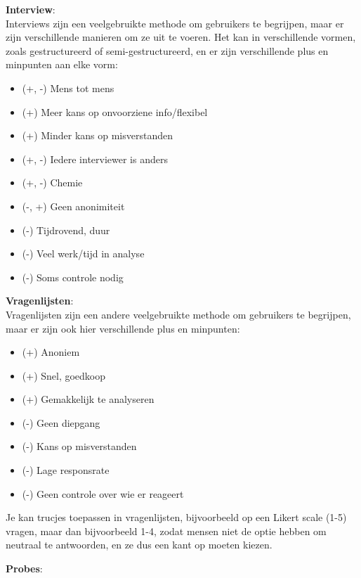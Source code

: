 \documentclass[nonacm, sigconf, balance=true]{acmart}
\begin{document}
    \noindent\textbf{Interview}:\\
    \noindent Interviews zijn een veelgebruikte methode om gebruikers te begrijpen, maar er zijn verschillende manieren om ze uit te voeren.
    Het kan in verschillende vormen, zoals gestructureerd of semi-gestructureerd, en er zijn verschillende plus en minpunten aan elke vorm:

    \begin{itemize}
        \item (+, -) Mens tot mens
        \item (+) Meer kans op onvoorziene info/flexibel
        \item (+) Minder kans op misverstanden
        \item (+, -) Iedere interviewer is anders
        \item (+, -) Chemie
        \item (-, +) Geen anonimiteit
        \item (-) Tijdrovend, duur
        \item (-) Veel werk/tijd in analyse
        \item (-) Soms controle nodig
    \end{itemize}

    \noindent\textbf{Vragenlijsten}:\\
    \noindent Vragenlijsten zijn een andere veelgebruikte methode om gebruikers te begrijpen, maar er zijn ook hier verschillende plus en minpunten:
    \begin{itemize}
        \item (+) Anoniem
        \item (+) Snel, goedkoop
        \item (+) Gemakkelijk te analyseren
        \item (-) Geen diepgang
        \item (-) Kans op misverstanden
        \item (-) Lage responsrate
        \item (-) Geen controle over wie er reageert
    \end{itemize}

    Je kan trucjes toepassen in vragenlijsten, bijvoorbeeld op een Likert scale (1-5) vragen, maar dan bijvoorbeeld 1-4, zodat mensen niet de optie hebben om neutraal te antwoorden, en ze dus een kant op moeten kiezen.

    \noindent\textbf{Probes}:\\
    \noindent %
\end{document}

